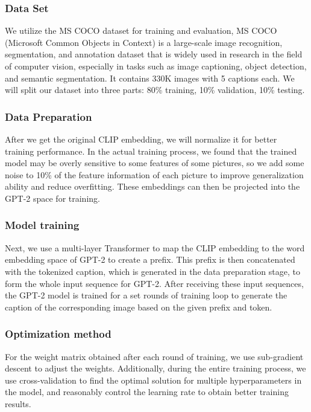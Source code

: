\documentclass[11pt]{article}
\begin{document}
    \subsubsection{Data Set}

    We utilize the MS COCO dataset \cite{COCO}for training and evaluation, 
    MS COCO (Microsoft Common Objects in Context) 
    is a large-scale image recognition, segmentation, 
    and annotation dataset that is widely used in research 
    in the field of computer vision, especially in tasks 
    such as image captioning, object detection, and semantic 
    segmentation. It contains 330K images with 5 captions each. 
    We will split our dataset into three parts: 80\% training, 10\% validation, 10\% testing.

    \subsubsection{Data Preparation}
    After we get the original CLIP embedding, we will normalize it for better training performance. In the actual training process, 
    we found that the trained model may be overly sensitive to some features of some pictures, 
    so we add some noise to 10\% of the feature information of each picture to improve generalization ability and reduce overfitting. 
    These embeddings can then be projected into the GPT-2 space for training.
\pagebreak
    \subsubsection{Model training}
    Next, we use a multi-layer Transformer to map the 
    CLIP embedding to the word embedding space of GPT-2 
    to create a prefix. This prefix is then concatenated 
    with the tokenized caption, which is generated in the data preparation stage,  
    to form the whole input sequence for GPT-2. After receiving these input sequences, 
    the GPT-2 model is trained for a set rounds of training loop to generate the caption of the corresponding image based on the given prefix and token.

    \subsubsection{Optimization method}
    For the weight matrix obtained after each round of training, we use sub-gradient descent 
    to adjust the weights. Additionally, during the entire training process, we use cross-validation to 
    find the optimal solution for multiple hyperparameters in the model, and reasonably control the learning rate to obtain better training results.
\end{document}
